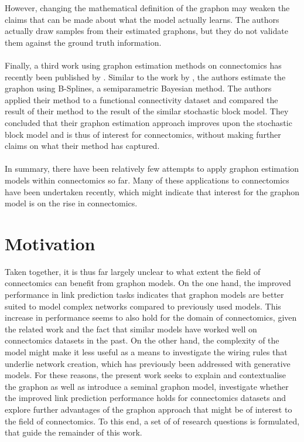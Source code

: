 \documentclass[11pt]{report} %
\begin{document}
However, changing the mathematical definition of the graphon may weaken the claims that can be made about what the model actually learns.
The authors actually draw samples from their estimated graphons, but they do not validate them against the ground truth information.\\\\
Finally, a third work using graphon estimation methods on connectomics has recently been published by . 
Similar to the work by , the authors estimate the graphon using B-Splines, a semiparametric Bayesian method. 
The authors applied their method to a functional connectivity dataset and compared the result of their method to the result of the similar stochastic block model. 
They concluded that their graphon estimation approach improves upon the stochastic block model and is thus of interest for connectomics, without making further claims on what their method has captured.\\\\
In summary, there have been relatively few attempts to apply graphon estimation models within connectomics so far.
Many of these applications to connectomics have been undertaken recently, which might indicate that interest for the graphon model is on the rise in connectomics.
\section{Motivation}
Taken together, it is thus far largely unclear to what extent the field of connectomics can benefit from graphon models.
On the one hand, the improved performance in link prediction tasks indicates that graphon models are better suited to model complex networks compared to previously used models.
This increase in performance seems to also hold for the domain of connectomics, given the related work and the fact that similar models have worked well on connectomics datasets in the past.
On the other hand, the complexity of the model might make it less useful as a means to investigate the wiring rules that underlie network creation, which has previously been addressed with generative models.
For these reasons, the present work seeks to explain and contextualise the graphon as well as introduce a seminal graphon model, investigate whether the improved link prediction performance holds for connectomics datasets and explore further advantages of the graphon approach that might be of interest to the field of connectomics.
To this end, a set of of research questions is formulated, that guide the remainder of this work.
\end{document}

